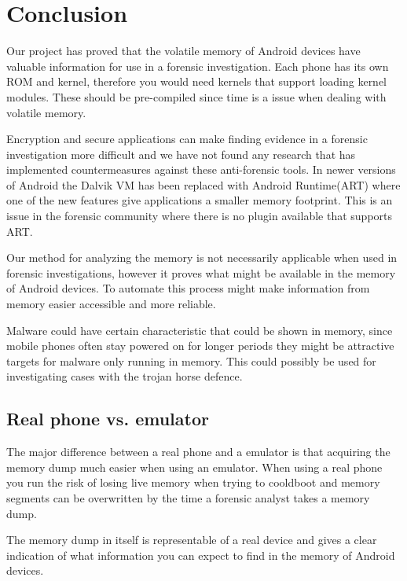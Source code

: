 \section{Conclusion}
Our project has proved that the volatile memory of Android devices have valuable information for use 
in a forensic investigation. %
Each phone has its own ROM and kernel, therefore you would need kernels that support loading kernel 
modules. These should be pre-compiled since time is a issue when dealing with volatile memory.

Encryption and secure applications can make finding evidence in a forensic investigation more difficult and we have not found 
any research that has implemented countermeasures against these anti-forensic tools. In newer versions 
of Android the Dalvik VM has been replaced with Android Runtime(ART) where one of the new 
features give applications a smaller memory footprint. This is an issue in the forensic community where there is no 
plugin available that supports ART.

Our method for analyzing the memory is not necessarily applicable when used in forensic investigations, 
however it proves what might be available in the memory of Android devices. 
To automate this process might make information from memory easier accessible and more reliable.

Malware could have certain characteristic that could be shown in memory, since mobile phones often stay 
powered on for longer periods they might be attractive targets for malware only running in memory. 
This could possibly be used for investigating cases with the trojan horse defence.

\subsection{Real phone vs. emulator}
The major difference between a real phone and a emulator is that acquiring the memory dump much 
easier when using an emulator. When using a real phone you run the risk of losing live memory when trying to cooldboot and 
memory segments can be overwritten by the time a forensic analyst takes a memory dump.

The memory dump in itself is representable of a real device and gives a clear indication of what 
information you can expect to find in the memory of Android devices.




